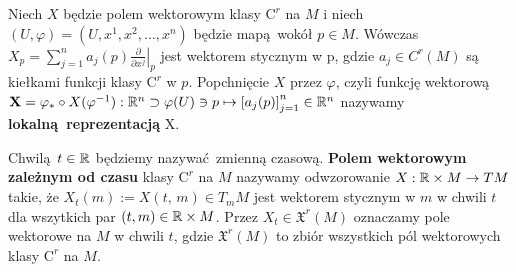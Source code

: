 

Niech \(X\) będzie polem wektorowym klasy \(\mathrm{C}^r\) na \(M\) i niech \((U, \varphi) = (U, x^1, x^2, \dots, x^n)\) będzie mapą wokół \(p\in M\). Wówczas \(X_p = \sum_{j=1}^{n}a_j(p)\left.\frac{\partial}{\partial x^j}\right|_p\) jest wektorem stycznym w p, gdzie \(a_j\in C^r(M)\) są kiełkami funkcji klasy \(\mathrm{C}^r\) w \(p\). Popchnięcie \(X\) przez \(\varphi\), czyli funkcję wektorową \(\mathbf{X} = \varphi_{\ast}\circ X(\varphi^{-1}): \mathbb{R}^n \supset \varphi(U)\ni p \mapsto \left[a_j(p)\right]_{j=1}^n\in \mathbb{R}^n\) nazywamy \textbf{lokalną reprezentacją} X.

\begin{figure}[!h]
\centering
{}
\end{figure}

Chwilą \(t\in\mathbb{R}\) będziemy nazywać zmienną czasową. \textbf{Polem wektorowym zależnym od czasu} klasy \(\mathrm{C}^r\) na \(M\) nazywamy odwzorowanie \(X:\mathbb{R}\times M\rightarrow TM\) takie, że \(X_t(m):=X(t,\,m) \in T_{m} M\) jest wektorem stycznym w \(m\) w chwili \(t\) dla wszytkich par \((t, m) \in \mathbb{R} \times M\). Przez \(X_t\in \mathfrak{X}^r(M)\) oznaczamy pole wektorowe na \(M\) w chwili \(t\), gdzie \(\mathfrak{X}^r(M)\) to zbiór wszystkich pól wektorowych klasy \(\mathrm{C}^r\) na \(M\).

